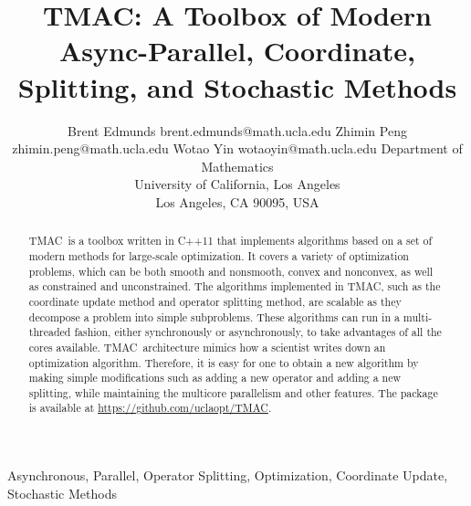 \documentclass[twoside,11pt]{article}
\newcommand{\pkg}{{TMAC}}
\newcommand{\repo}{\url{https://github.com/uclaopt/TMAC}}
\begin{document}
\title{\pkg: A Toolbox of Modern Async-Parallel, Coordinate, Splitting, and Stochastic Methods}

\author{\name Brent Edmunds \email brent.edmunds@math.ucla.edu
       \AND
       \name Zhimin Peng \email zhimin.peng@math.ucla.edu
       \AND
        \name Wotao Yin \email wotaoyin@math.ucla.edu 
       \AND
       \addr Department of Mathematics\\
       University of California, Los Angeles\\
       Los Angeles, CA 90095, USA}

\maketitle

\begin{abstract}
\pkg~is a toolbox written in C++11 that implements algorithms based on a set of modern methods for large-scale optimization. It covers a variety of optimization problems, which can be both smooth and nonsmooth, convex and nonconvex, as well as constrained and unconstrained. The algorithms implemented in \pkg, such as the coordinate update method and operator splitting method, are scalable as they decompose a problem into simple subproblems. These algorithms can run in a multi-threaded fashion, either synchronously or asynchronously, to take advantages of all the cores available. \pkg~architecture mimics how a scientist writes down an optimization algorithm. Therefore, it is easy for one to obtain a new algorithm by making simple modifications such as adding a new operator and adding a new splitting, while maintaining the multicore parallelism and other features. The package is available at \repo.
\end{abstract}

\begin{keywords}
Asynchronous, Parallel, Operator Splitting, Optimization, Coordinate Update, Stochastic Methods
\end{keywords}








% 

%

%

%


% 


% 

% 

% 





\end{document}
